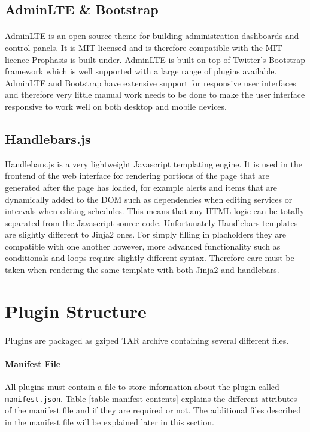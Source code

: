 \documentclass[bsc,logo,twoside,singlespacing,notimes]{infthesis}
\begin{document}
\subsection{AdminLTE \& Bootstrap}
\paragraph*{}
	AdminLTE is an open source theme for building administration dashboards and
	control panels.  It is MIT licensed and is therefore compatible with the MIT
	licence Prophasis is built under.  AdminLTE is built on top of Twitter's
	Bootstrap framework which is well supported with a large range of plugins
	available.  AdminLTE and Bootstrap have extensive support for responsive user
	interfaces and therefore very little manual work needs to be done to make the
	user interface responsive to work well on both desktop and mobile devices.

\subsection{Handlebars.js}
	Handlebars.js is a very lightweight Javascript templating engine.  It is used
	in the frontend of the web interface for rendering portions of the page that
	are generated after the page has loaded, for example alerts and items that are
	dynamically added to the DOM such as dependencies when editing services or
	intervals when editing schedules.  This means that any HTML logic can be
	totally separated from the Javascript source code.  Unfortunately Handlebars
	templates are slightly different to Jinja2 ones.  For simply filling in
	placholders they are compatible with one another however, more advanced
	functionality such as conditionals and loops require slightly different syntax.
	Therefore care must be taken when rendering the same template with both Jinja2
	and handlebars.

\section{Plugin Structure}
\paragraph*{}
	Plugins are packaged as gziped TAR archive containing several different files.

\paragraph*{Manifest File}
	All plugins must contain a file to store information about the plugin called
 	\texttt{manifest.json}. Table \ref{table-manifest-contents} explains the
 	different attributes of the manifest file and if they are required or not.
 	The additional files described in the manifest file will be explained later in
 	this section.
 	
\end{document}
